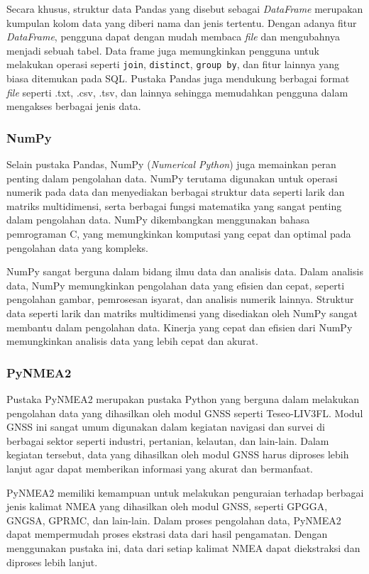 Secara khusus, struktur data Pandas yang disebut sebagai \textit{DataFrame} merupakan kumpulan kolom data yang diberi nama dan jenis tertentu. Dengan adanya fitur \textit{DataFrame}, pengguna dapat dengan mudah membaca \textit{file} dan mengubahnya menjadi sebuah tabel. Data frame juga memungkinkan pengguna untuk melakukan operasi seperti \texttt{join}, \texttt{distinct}, \texttt{group by}, dan fitur lainnya yang biasa ditemukan pada SQL. Pustaka Pandas juga mendukung berbagai format \textit{file} seperti .txt, .csv, .tsv, dan lainnya sehingga memudahkan pengguna dalam mengakses berbagai jenis data.

\subsubsection{NumPy}
Selain pustaka Pandas, NumPy (\textit{Numerical Python}) juga memainkan peran penting dalam pengolahan data. NumPy terutama digunakan untuk operasi numerik pada data dan menyediakan berbagai struktur data seperti larik dan matriks multidimensi, serta berbagai fungsi matematika yang sangat penting dalam pengolahan data. NumPy dikembangkan menggunakan bahasa pemrograman C, yang memungkinkan komputasi yang cepat dan optimal pada pengolahan data yang kompleks.

NumPy sangat berguna dalam bidang ilmu data dan analisis data. Dalam analisis data, NumPy memungkinkan pengolahan data yang efisien dan cepat, seperti pengolahan gambar, pemrosesan isyarat, dan analisis numerik lainnya. Struktur data seperti larik dan matriks multidimensi yang disediakan oleh NumPy sangat membantu dalam pengolahan data. Kinerja yang cepat dan efisien dari NumPy memungkinkan analisis data yang lebih cepat dan akurat.

\subsubsection{PyNMEA2}
Pustaka PyNMEA2 merupakan pustaka Python yang berguna dalam melakukan pengolahan data yang dihasilkan oleh modul GNSS seperti Teseo\hyp{}LIV3FL. Modul GNSS ini sangat umum digunakan dalam kegiatan navigasi dan survei di berbagai sektor seperti industri, pertanian, kelautan, dan lain-lain. Dalam kegiatan tersebut, data yang dihasilkan oleh modul GNSS harus diproses lebih lanjut agar dapat memberikan informasi yang akurat dan bermanfaat.

PyNMEA2 memiliki kemampuan untuk melakukan penguraian terhadap berbagai jenis kalimat NMEA yang dihasilkan oleh modul GNSS, seperti GPGGA, GNGSA, GPRMC, dan lain-lain. Dalam proses pengolahan data, PyNMEA2 dapat mempermudah proses ekstrasi data dari hasil pengamatan. Dengan menggunakan pustaka ini, data dari setiap kalimat NMEA dapat diekstraksi dan diproses lebih lanjut.

